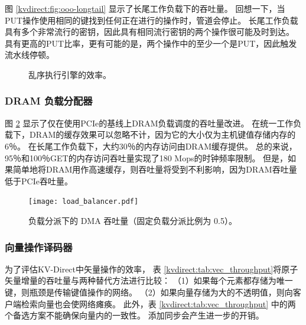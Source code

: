 图 \ref {kvdirect:fig:ooo-longtail} 显示了长尾工作负载下的吞吐量。
回想一下，当PUT操作使用相同的键找到任何正在进行的操作时，管道会停止。
长尾工作负载具有多个非常流行的密钥，因此具有相同流行密钥的两个操作很可能及时到达。
具有更高的PUT比率，更有可能的是，两个操作中的至少一个是PUT，因此触发流水线停顿。


\begin{figure}[t]
	\centering
	\caption{乱序执行引擎的效率。}
	\label{kvdirect:fig:ooo-eval}
\end{figure}

\subsubsection{DRAM 负载分配器}
\label{kvdirect:sec:dram-eval}

图 \ref {kvdirect:fig:cache-tput} 显示了仅在使用PCIe的基线上DRAM负载调度的吞吐量改进。
在统一工作负载下，DRAM的缓存效果可以忽略不计，因为它的大小仅为主机键值存储内存的6％。
在长尾工作负载下，大约30％的内存访问由DRAM缓存提供。 总的来说，95％和100％GET的内存访问吞吐量实现了180 Mops的时钟频率限制。
但是，如果简单地将DRAM用作高速缓存，则吞吐量将受到不利影响，因为DRAM吞吐量低于PCIe吞吐量。


\begin{figure}[t]
	\centering
	{\texttt{[image: load\_balancer.pdf]}}
	\caption{负载分派下的 DMA 吞吐量（固定负载分派比例为 0.5）。}
	\label{kvdirect:fig:cache-tput}
\end{figure}


\subsubsection{向量操作译码器}
\label{kvdirect:network-eval}


为了评估KV-Direct中矢量操作的效率，
表 \ref {kvdirect:tab:vec_throughput}将原子矢量增量的吞吐量与两种替代方法进行比较：
（1）如果每个元素都存储为唯一键，则瓶颈是传输键值操作的网络。
（2）如果向量存储为大的不透明值，则向客户端检索向量也会使网络瘫痪。
此外，表 \ref {kvdirect:tab:vec_throughput} 中的两个备选方案不能确保向量内的一致性。 添加同步会产生进一步的开销。


